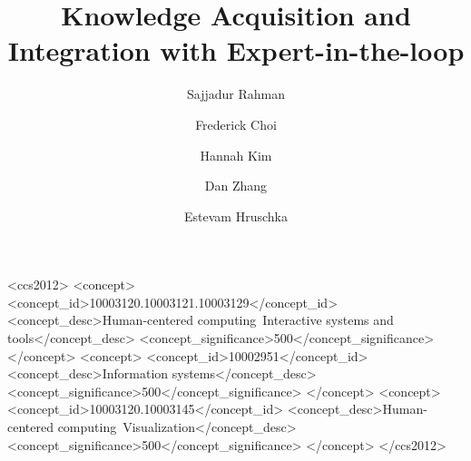 \documentclass[sigconf]{acmart}
\DeclareRobustCommand{\basesystem}{{\sc Magneton}\xspace}%
\begin{document}
\title{Knowledge Acquisition and Integration with Expert-in-the-loop}

\author{Sajjadur Rahman}
\author{Frederick Choi}
\author{Hannah Kim}
\author{Dan Zhang}
\author{Estevam Hruschka}



\begin{CCSXML}
<ccs2012>
   <concept>
       <concept_id>10003120.10003121.10003129</concept_id>
       <concept_desc>Human-centered computing~Interactive systems and tools</concept_desc>
       <concept_significance>500</concept_significance>
       </concept>
   <concept>
       <concept_id>10002951</concept_id>
       <concept_desc>Information systems</concept_desc>
       <concept_significance>500</concept_significance>
       </concept>
   <concept>
       <concept_id>10003120.10003145</concept_id>
       <concept_desc>Human-centered computing~Visualization</concept_desc>
       <concept_significance>500</concept_significance>
       </concept>
 </ccs2012>
\end{CCSXML}




\end{document}
